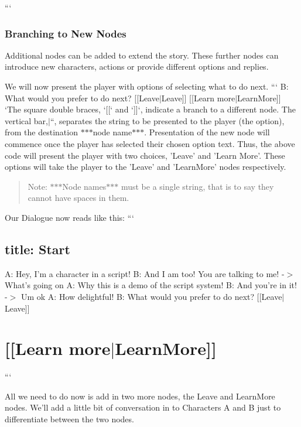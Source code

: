 ```

\subsubsection*{Branching to New Nodes}

Additional nodes can be added to extend the story. These further nodes can introduce new characters, actions or provide different options and replies.

We will now present the player with options of selecting what to do next. ``` B\-: What would you prefer to do next? \mbox{[}\mbox{[}Leave$\vert$\-Leave\mbox{]}\mbox{]} \mbox{[}\mbox{[}Learn more$\vert$\-Learn\-More\mbox{]}\mbox{]} `{\ttfamily  The square double braces, `\mbox{[}\mbox{[}` and `\mbox{]}\mbox{]}`, indicate a branch to a different node. The vertical bar,}$\vert$``, separates the string to be presented to the player (the option), from the destination $\ast$$\ast$$\ast$node name$\ast$$\ast$$\ast$. Presentation of the new node will commence once the player has selected their chosen option text. Thus, the above code will present the player with two choices, 'Leave' and 'Learn More'. These options will take the player to the 'Leave' and 'Learn\-More' nodes respectively.

\begin{quotation}
Note\-: $\ast$$\ast$$\ast$\-Node names$\ast$$\ast$$\ast$ must be a single string, that is to say they cannot have spaces in them.

\end{quotation}


Our Dialogue now reads like this\-: ``` \subsection*{title\-: Start }

A\-: Hey, I'm a character in a script! B\-: And I am too! You are talking to me! -\/$>$ What's going on A\-: Why this is a demo of the script system! B\-: And you're in it! -\/$>$ Um ok A\-: How delightful! B\-: What would you prefer to do next? \mbox{[}\mbox{[}Leave$\vert$\-Leave\mbox{]}\mbox{]} \section*{\mbox{[}\mbox{[}Learn more$\vert$\-Learn\-More\mbox{]}\mbox{]} }

```

All we need to do now is add in two more nodes, the Leave and Learn\-More nodes. We'll add a little bit of conversation in to Characters A and B just to differentiate between the two nodes.

